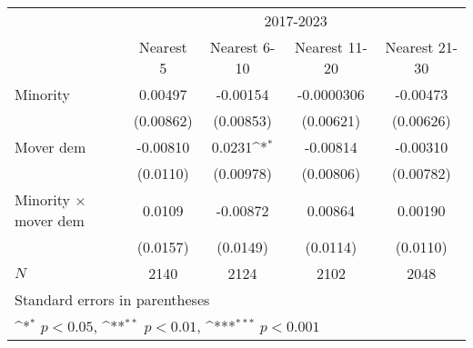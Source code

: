 {
\def\sym#1{\ifmmode^{#1}\else\(^{#1}\)\fi}
\begin{tabular}{l*{4}{c}}
\hline\hline
            &\multicolumn{4}{c}{2017-2023}                                                          \\\cmidrule(lr){2-5}
            &\multicolumn{1}{c}{Nearest 5}&\multicolumn{1}{c}{Nearest 6-10}&\multicolumn{1}{c}{Nearest 11-20}&\multicolumn{1}{c}{Nearest 21-30}\\
\hline
Minority    &     0.00497         &    -0.00154         &  -0.0000306         &    -0.00473         \\
            &   (0.00862)         &   (0.00853)         &   (0.00621)         &   (0.00626)         \\
[1em]
Mover dem   &    -0.00810         &      0.0231\sym{*}  &    -0.00814         &    -0.00310         \\
            &    (0.0110)         &   (0.00978)         &   (0.00806)         &   (0.00782)         \\
[1em]
Minority $\times$ mover dem&      0.0109         &    -0.00872         &     0.00864         &     0.00190         \\
            &    (0.0157)         &    (0.0149)         &    (0.0114)         &    (0.0110)         \\
\hline
\(N\)       &        2140         &        2124         &        2102         &        2048         \\
\hline\hline
\multicolumn{5}{l}{\footnotesize Standard errors in parentheses}\\
\multicolumn{5}{l}{\footnotesize \sym{*} \(p<0.05\), \sym{**} \(p<0.01\), \sym{***} \(p<0.001\)}\\
\end{tabular}
}

